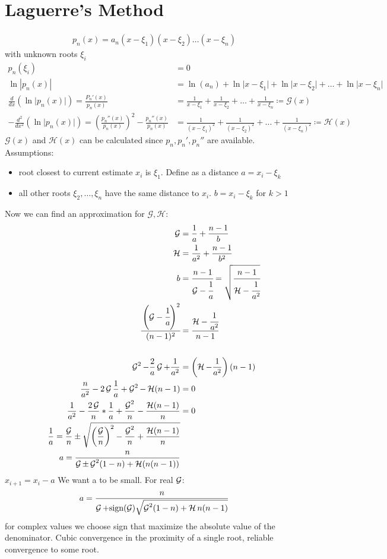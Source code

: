 \section{Laguerre's Method}\label{sec:laguerres-method}
\begin{align*}
    p_n(x) = a_n(x-\xi_1)(x-\xi_2)\ldots(x-\xi_n)
\end{align*}
with unknown roots $\xi_i$
\begin{align*}
    p_n(\xi_i) &= 0\\
    \ln | p_n(x) | &= \ln(a_n) + \ln \lvert x- \xi_1 \rvert + \ln \lvert x- \xi_2 \rvert
    +\ldots + \ln \lvert x- \xi_n \rvert\\
    \frac{d}{dx} \left( \ln \lvert p_n(x)\rvert \right) = \frac{P_n'(x)}{p_n(x)}
    &= \frac{1}{x-\xi_1}+\frac{1}{x-\xi_2}+ \ldots + \frac{1}{x-\xi_n} \coloneqq \mathcal{G}(x)\\
    -\frac{d^2}{dx^2}(\ln \lvert p_n(x) \rvert)= \left( \frac{p_n''(x)}{p_n(x)}\right)^2-\frac{p_n''(x)}{p_n(x)}
    &= \frac{1}{(x-\xi_1)^2}+\frac{1}{(x-\xi_2)^2}+\ldots+\frac{1}{(x-\xi_n)^2} \coloneqq \mathcal{H}(x)
\end{align*}
$\mathcal{G}(x)$ and $\mathcal{H}(x)$ can be calculated since $p_n, p_n', p_n''$ are available.
Assumptions:
\begin{itemize}
    \item root closest to current estimate $x_i$ is $\xi_1$.
    Define as a distance $a=x_i-\xi_k$
    \item all other roots $\xi_2, \ldots, \xi_n$ have the same distance to $x_i$. $b=x_i-\xi_k$ for $k>1$
\end{itemize}
Now we can find an approximation for $\mathcal{G}, \mathcal{H}$:
\begin{align*}
    \mathcal{G}&= \frac{1}{a}+ \frac{n-1}{b}\\
    \mathcal{H}&= \frac{1}{a^2}+\frac{n-1}{b^2}\\
    b &= \cfrac{n-1}{\mathcal{G}-\cfrac{1}{a}}= \sqrt{\cfrac{n-1}{\mathcal{H}-\cfrac{1}{a^2}}}\\
    \cfrac{\left(\mathcal{G}-\cfrac{1}{a} \right)^2}{(n-1)^2} &= \cfrac{\mathcal{H}- \cfrac{1}{a^2}}{n-1}\\
    \\
    \operatorname{\mathcal{G}}^2-\frac{2}{a}\operatorname{\mathcal{G}} + \frac{1}{a^2}&=\left(\operatorname{\mathcal{H}}-\frac{1}{a^2} \right)(n-1)\\
    \frac{n}{a^2}-2 \operatorname{\mathcal{G}} \frac{1}{a}+ \operatorname{\mathcal{G}}^2- \operatorname{\mathcal{H}}(n-1)&=0\\
    \frac{1}{a^2}- \frac{2 \operatorname{\mathcal{G}}}{n}*\frac{1}{a}+\frac{\operatorname{\mathcal{G}}^2}{n}-\frac{\operatorname{\mathcal{H}} (n-1)}{n} &= 0\\
    \frac{1}{a}= \frac{\operatorname{\mathcal{G}}}{n} \pm \sqrt {\left(\frac{\operatorname{\mathcal{G}}}{n} \right)^2-\frac{\operatorname{\mathcal{G}}^2}{n}+ \frac{\operatorname{\mathcal{H}} (n-1)}{n}}\\
    a=\frac{n}{\operatorname{\mathcal{G}} \pm \operatorname{\mathcal{G}}^2(1-n)+ \operatorname{\mathcal{H}} (n(n-1))}
\end{align*}
$x_{i+1}=x_i -a$ We want a to be small.
For real $\operatorname{\mathcal{G}}$:
\begin{equation*}
    a = \frac{n}{\operatorname{\mathcal{G}} + \text{sign}(\operatorname{\mathcal{G}}) \sqrt {\operatorname{\mathcal{G}}^2(1-n)+ \operatorname{\mathcal{H}} n(n-1)}}
\end{equation*}
for complex values we choose sign that maximize the absolute value of the denominator.
\textrightarrow{} Cubic convergence in the proximity of a single root, reliable convergence to some root.

